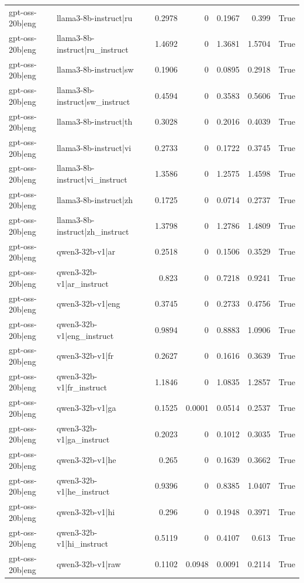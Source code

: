 \begin{table}
\begin{tabular}{l l r r r r l}
gpt-oss-20b|eng & llama3-8b-instruct|ru & 0.2978 & 0 & 0.1967 & 0.399 & True \\
gpt-oss-20b|eng & llama3-8b-instruct|ru_instruct & 1.4692 & 0 & 1.3681 & 1.5704 & True \\
gpt-oss-20b|eng & llama3-8b-instruct|sw & 0.1906 & 0 & 0.0895 & 0.2918 & True \\
gpt-oss-20b|eng & llama3-8b-instruct|sw_instruct & 0.4594 & 0 & 0.3583 & 0.5606 & True \\
gpt-oss-20b|eng & llama3-8b-instruct|th & 0.3028 & 0 & 0.2016 & 0.4039 & True \\
gpt-oss-20b|eng & llama3-8b-instruct|vi & 0.2733 & 0 & 0.1722 & 0.3745 & True \\
gpt-oss-20b|eng & llama3-8b-instruct|vi_instruct & 1.3586 & 0 & 1.2575 & 1.4598 & True \\
gpt-oss-20b|eng & llama3-8b-instruct|zh & 0.1725 & 0 & 0.0714 & 0.2737 & True \\
gpt-oss-20b|eng & llama3-8b-instruct|zh_instruct & 1.3798 & 0 & 1.2786 & 1.4809 & True \\
gpt-oss-20b|eng & qwen3-32b-v1|ar & 0.2518 & 0 & 0.1506 & 0.3529 & True \\
gpt-oss-20b|eng & qwen3-32b-v1|ar_instruct & 0.823 & 0 & 0.7218 & 0.9241 & True \\
gpt-oss-20b|eng & qwen3-32b-v1|eng & 0.3745 & 0 & 0.2733 & 0.4756 & True \\
gpt-oss-20b|eng & qwen3-32b-v1|eng_instruct & 0.9894 & 0 & 0.8883 & 1.0906 & True \\
gpt-oss-20b|eng & qwen3-32b-v1|fr & 0.2627 & 0 & 0.1616 & 0.3639 & True \\
gpt-oss-20b|eng & qwen3-32b-v1|fr_instruct & 1.1846 & 0 & 1.0835 & 1.2857 & True \\
gpt-oss-20b|eng & qwen3-32b-v1|ga & 0.1525 & 0.0001 & 0.0514 & 0.2537 & True \\
gpt-oss-20b|eng & qwen3-32b-v1|ga_instruct & 0.2023 & 0 & 0.1012 & 0.3035 & True \\
gpt-oss-20b|eng & qwen3-32b-v1|he & 0.265 & 0 & 0.1639 & 0.3662 & True \\
gpt-oss-20b|eng & qwen3-32b-v1|he_instruct & 0.9396 & 0 & 0.8385 & 1.0407 & True \\
gpt-oss-20b|eng & qwen3-32b-v1|hi & 0.296 & 0 & 0.1948 & 0.3971 & True \\
gpt-oss-20b|eng & qwen3-32b-v1|hi_instruct & 0.5119 & 0 & 0.4107 & 0.613 & True \\
gpt-oss-20b|eng & qwen3-32b-v1|raw & 0.1102 & 0.0948 & 0.0091 & 0.2114 & True \\

\end{tabular}
\end{table}
